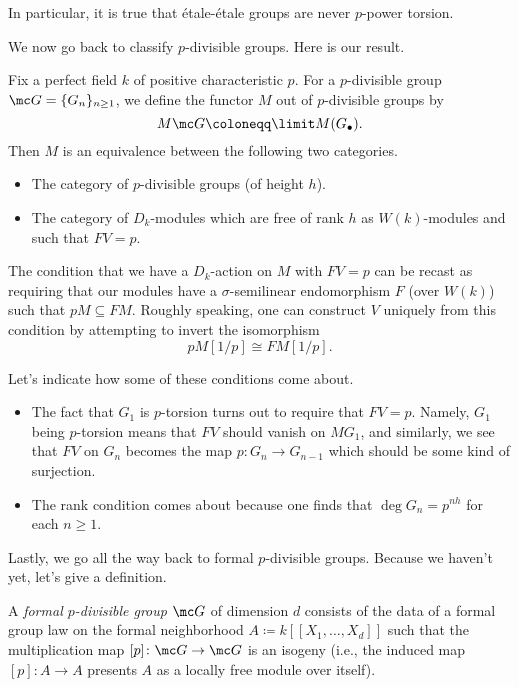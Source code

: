 \documentclass[../notes.tex]{subfiles}
\begin{document}
\begin{remark}
	In particular, it is true that \'etale-\'etale groups are never $p$-power torsion.
\end{remark}
We now go back to classify $p$-divisible groups. Here is our result.
\begin{theorem}
	Fix a perfect field $k$ of positive characteristic $p$. For a $p$-divisible group $\mc G=\{G_n\}_{n\ge1}$, we define the functor $M$ out of $p$-divisible groups by
	\[M\mc G\coloneqq\limit M(G_\bullet).\]
	Then $M$ is an equivalence between the following two categories.
	\begin{itemize}
		\item The category of $p$-divisible groups (of height $h$).
		\item The category of $D_k$-modules which are free of rank $h$ as $W(k)$-modules and such that $FV=p$.
	\end{itemize}
\end{theorem}
\begin{remark}
	The condition that we have a $D_k$-action on $M$ with $FV=p$ can be recast as requiring that our modules have a $\sigma$-semilinear endomorphism $F$ (over $W(k)$) such that $pM\subseteq FM$. Roughly speaking, one can construct $V$ uniquely from this condition by attempting to invert the isomorphism
	\[pM[1/p]\cong FM[1/p].\]
\end{remark}
Let's indicate how some of these conditions come about.
\begin{itemize}
	\item The fact that $G_1$ is $p$-torsion turns out to require that $FV=p$. Namely, $G_1$ being $p$-torsion means that $FV$ should vanish on $MG_1$, and similarly, we see that $FV$ on $G_n$ becomes the map $p\colon G_n\to G_{n-1}$ which should be some kind of surjection.
	\item The rank condition comes about because one finds that $\deg G_n=p^{nh}$ for each $n\ge1$.
\end{itemize}
Lastly, we go all the way back to formal $p$-divisible groups. Because we haven't yet, let's give a definition.
\begin{definition}
	A \textit{formal $p$-divisible group} $\mc G$ of dimension $d$ consists of the data of a formal group law on the formal neighborhood $A\coloneqq k[[X_1,\ldots,X_d]]$ such that the multiplication map $[p]\colon\mc G\to\mc G$ is an isogeny (i.e., the induced map $[p]\colon A\to A$ presents $A$ as a locally free module over itself).
\end{definition}
\end{document}
